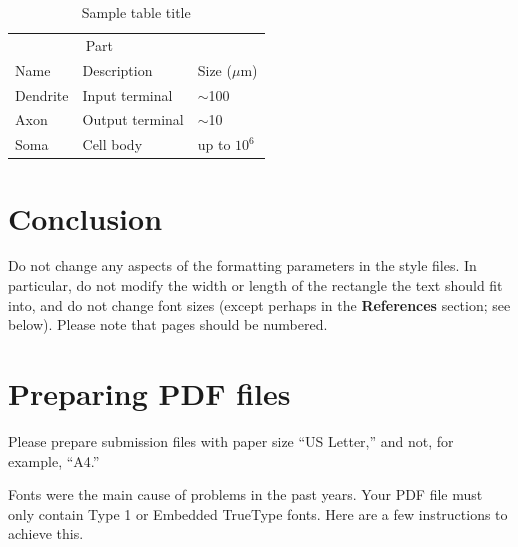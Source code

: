 \documentclass{article}
\begin{document}
\begin{table}
  \caption{Sample table title}
  \label{sample-table}
  \centering
  \begin{tabular}{lll}
    \toprule
    \multicolumn{2}{c}{Part}                   \\
    \cmidrule(r){1-2}
    Name     & Description     & Size ($\mu$m) \\
    \midrule
    Dendrite & Input terminal  & $\sim$100     \\
    Axon     & Output terminal & $\sim$10      \\
    Soma     & Cell body       & up to $10^6$  \\
    \bottomrule
  \end{tabular}
\end{table}

\section{Conclusion}\label{sec:conclusion}

Do not change any aspects of the formatting parameters in the style files.  In
particular, do not modify the width or length of the rectangle the text should
fit into, and do not change font sizes (except perhaps in the
\textbf{References} section; see below). Please note that pages should be
numbered.

\section{Preparing PDF files}

Please prepare submission files with paper size ``US Letter,'' and not, for
example, ``A4.''

Fonts were the main cause of problems in the past years. Your PDF file must only
contain Type 1 or Embedded TrueType fonts. Here are a few instructions to
achieve this.
\end{document}
